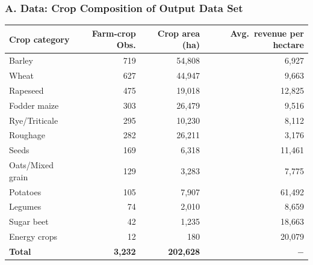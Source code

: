 \documentclass[t,24pt,aspectratio=169]{beamer}
\begin{document}
\begin{frame}[hvid]
\frametitle{\vspace{-3ex}A. Data: Crop Composition of Output Data Set}

\begin{table}[H]
\centering
\small
\begin{tabular}{lrrr}
\toprule
\textbf{Crop category} & \textbf{Farm-crop Obs.} & \textbf{Crop area (ha)} & \textbf{Avg.\ revenue per hectare} \\
\midrule
Barley              &   719 & 54{,}808 &  6{,}927 \\
Wheat               &   627 & 44{,}947 &  9{,}663 \\
Rapeseed            &   475 & 19{,}018 & 12{,}825 \\
Fodder maize        &   303 & 26{,}479 &  9{,}516 \\
Rye/Triticale       &   295 & 10{,}230 &  8{,}112 \\
Roughage            &   282 & 26{,}211 &  3{,}176 \\
Seeds               &   169 &  6{,}318 & 11{,}461 \\
Oats/Mixed grain    &   129 &  3{,}283 &  7{,}775 \\
Potatoes            &   105 &  7{,}907 & 61{,}492 \\
Legumes             &    74 &  2{,}010 &  8{,}659 \\
Sugar beet          &    42 &  1{,}235 & 18{,}663 \\
Energy crops        &    12 &    180   & 20{,}079 \\
\midrule
\textbf{Total}      & \textbf{3{,}232} & \textbf{202{,}628} & $-$ \\
\bottomrule
\end{tabular}
\end{table}

\end{frame}
\end{document}
